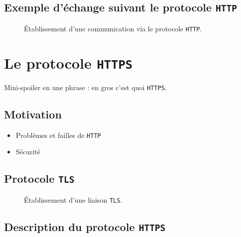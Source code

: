 \documentclass[a4paper,11pt]{article}
\begin{document}
\subsection{Exemple d'échange suivant le protocole {\tt HTTP}}

\begin{figure}[!h]
\begin{center}
  \caption{\'Etablissement d'une communication via le protocole {\tt HTTP}.}
  \label{etiquette_de_la_figure_pour_y_faire_reference_plus_tard}
\end{center}
\end{figure}


\section{Le protocole {\tt HTTPS}}

Mini-spoiler en une phrase : en gros c'est quoi {\tt HTTPS}.

\subsection{Motivation}

\begin{itemize}
\item Problèmes et failles de {\tt HTTP}
\item Sécurité
\end{itemize}


\subsection{Protocole {\tt TLS}}

\begin{figure}[!h]
\begin{center}
  \caption{\'Etablissement d'une liaison {\tt TLS}.}
  \label{etiquette_de_la_figure_pour_y_faire_reference_plus_tard}
\end{center}
\end{figure}

\subsection{Description du protocole {\tt HTTPS}}
\end{document}
